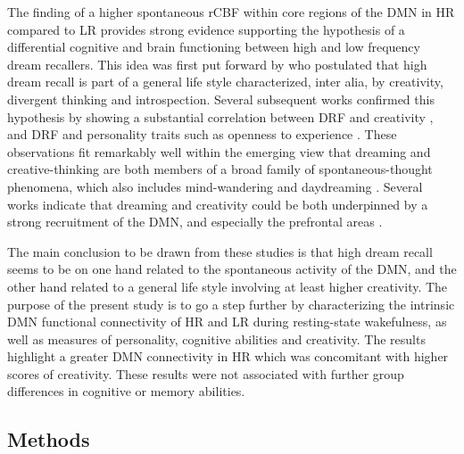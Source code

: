 The finding of a higher spontaneous rCBF within core regions of the DMN in HR compared to LR provides strong evidence supporting the hypothesis of a differential cognitive and brain functioning between high and low frequency dream recallers. This idea was first put forward by \citet{schonbar_differential_1965} who postulated that high dream recall is part of a general life style characterized, inter alia, by creativity, divergent thinking and introspection. Several subsequent works confirmed this hypothesis by showing a substantial correlation between DRF and creativity \citep{fitch_variations_1989, schredl_creativity_1995, schredl_factors_2003}, and DRF and personality traits such as openness to experience \citep{hartmann_boundaries_1989, schredl_dreaming_1996, schredl_dream_2003}. These observations fit remarkably well within the emerging view that dreaming and creative-thinking are both members of a broad family of spontaneous-thought phenomena, which also includes mind-wandering and daydreaming \citep{christoff_mind-wandering_2016}. Several works indicate that dreaming and creativity could be both underpinned by a strong recruitment of the DMN, and especially the prefrontal areas \citep{domhoff_neural_2011, ellamil_evaluative_2012, jung_structure_2013, beaty_creativity_2014, mok_interplay_2014, beaty_default_2015, christoff_mind-wandering_2016}.

The main conclusion to be drawn from these studies is that high dream recall seems to be on one hand related to the spontaneous activity of the DMN, and the other hand related to a general life style involving at least higher creativity. The purpose of the present study is to go a step further by characterizing the intrinsic DMN functional connectivity of HR and LR during resting-state wakefulness, as well as measures of personality, cognitive abilities and creativity. The results highlight a greater DMN connectivity in HR which was concomitant with higher scores of creativity. These results were not associated with further group differences in cognitive or memory abilities.

\subsection*{Methods}
\label{res:dmn-crea:methods}

